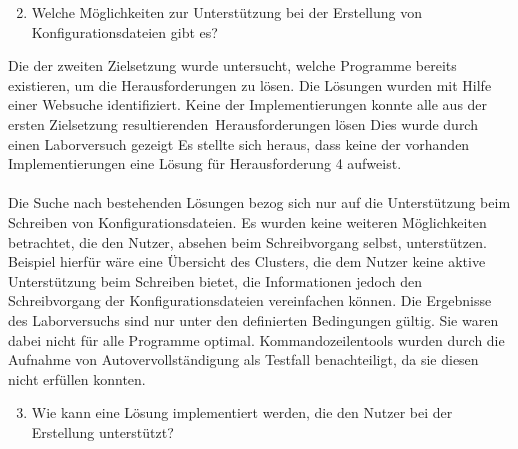 \begin{enumerate}
    \setcounter{enumi}{1}
    \item Welche Möglichkeiten zur Unterstützung bei der Erstellung von Konfigurationsdateien gibt es?
\end{enumerate}

Die der zweiten Zielsetzung wurde untersucht, welche Programme bereits existieren, um die Herausforderungen zu lösen.
Die Lösungen wurden mit Hilfe einer Websuche identifiziert.
Keine der Implementierungen konnte alle aus der ersten Zielsetzung resultierenden\ Herausforderungen lösen
Dies wurde durch einen Laborversuch gezeigt
Es stellte sich heraus, dass keine der vorhanden Implementierungen eine Lösung für Herausforderung 4 aufweist.
\\\\
Die Suche nach bestehenden Lösungen bezog sich nur auf die Unterstützung beim Schreiben von Konfigurationsdateien.
Es wurden keine weiteren Möglichkeiten betrachtet, die den Nutzer, absehen beim Schreibvorgang selbst, unterstützen.
Beispiel hierfür wäre eine Übersicht des Clusters, die dem Nutzer keine aktive Unterstützung beim Schreiben bietet,
die Informationen jedoch den Schreibvorgang der Konfigurationsdateien vereinfachen können.
Die Ergebnisse des Laborversuchs sind nur unter den definierten Bedingungen gültig.
Sie waren dabei nicht für alle Programme optimal. Kommandozeilentools wurden durch die Aufnahme von Autovervollständigung als Testfall benachteiligt,
da sie diesen nicht erfüllen konnten.

\begin{enumerate}
    \setcounter{enumi}{2}
    \item Wie kann eine Lösung implementiert werden, die den Nutzer bei der Erstellung unterstützt?
\end{enumerate}

